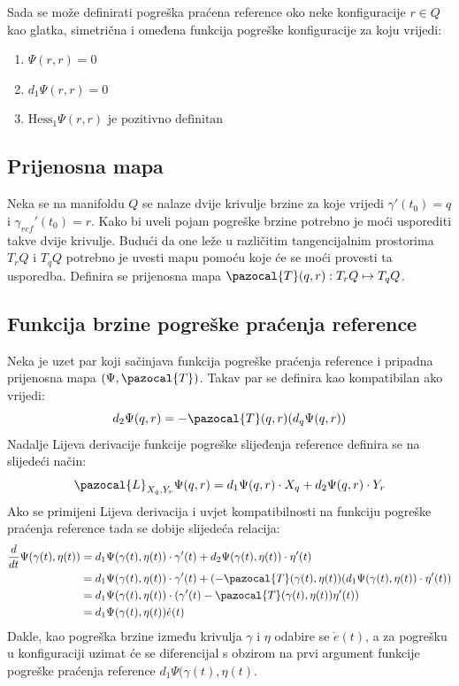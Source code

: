 \documentclass[times, utf8, diplomski]{fer}
\newcommand{\Ta}{\pazocal{T}}
\newcommand{\La}{\pazocal{L}}
\begin{document}
	\newpage
	\clearpage
	Sada se može definirati pogreška praćena reference oko neke konfiguracije $r\in Q$ kao glatka, simetrična i omeđena funkcija pogreške konfiguracije za koju vrijedi: 
	\begin{enumerate}
		\item $\Psi(r,r)=0$
		
		\item $d_1 \Psi(r, r) = 0$
		
		\item $\text{Hess}_1\Psi (r, r)\text{ je pozitivno definitan}$
	\end{enumerate}
	
	\subsection{Prijenosna mapa} Neka se na manifoldu $Q$ se nalaze dvije krivulje brzine za koje vrijedi $\gamma'(t_0)=q$ i $\gamma_{ref}'(t_0)=r$. Kako bi uveli pojam pogreške brzine potrebno je moći usporediti takve dvije krivulje. Budući da one leže u različitim tangencijalnim prostorima $T_r Q$ i $T_q Q$ potrebno je uvesti mapu pomoću koje će se moći provesti ta usporedba. Definira se prijenosna mapa $\Ta(q,r): T_r Q \mapsto T_q Q$.
	
	\subsection{Funkcija brzine pogreške praćenja reference} Neka je uzet par koji sačinjava funkcija pogreške praćenja reference i pripadna prijenosna mapa $(\Psi, \Ta)$. Takav par se definira kao kompatibilan ako vrijedi:
	\begin{equation}
		d_2\Psi(q,r) = - \Ta(q,r)(d_q\Psi(q,r))
	\end{equation}
	\noindent Nadalje Lijeva derivacije funkcije pogreške slijeđenja reference definira se na slijedeći način:
	\begin{equation}
		\La_{X_q, Y_r}\Psi(q,r) = d_1\Psi(q,r) \cdot X_q + d_2\Psi(q,r) \cdot Y_r
	\end{equation}
	\noindent Ako se primijeni Lijeva derivacija i uvjet kompatibilnosti na funkciju pogreške praćenja reference tada se dobije slijedeća relacija:
	\begin{align}
		\frac{d}{dt} \Psi(\gamma(t), \eta(t)) &= d_1\Psi(\gamma(t), \eta(t)) \cdot \gamma '(t) + d_2\Psi(\gamma(t), \eta(t)) \cdot \eta ' (t)\\
		&= d_1\Psi(\gamma(t), \eta(t)) \cdot \gamma '(t) + (- \Ta(\gamma(t), \eta(t))(d_1\Psi(\gamma(t), \eta(t)) \cdot \eta'(t)) \\
		&= d_1\Psi(\gamma(t), \eta(t)) \cdot (\gamma '(t) - \Ta(\gamma(t), \eta(t))\eta'(t)) \label{error}\\
		&= d_1\Psi(\gamma(t), \eta(t)) \dot{e}(t)
	\end{align}
	Dakle, kao pogreška brzine između krivulja $\gamma$ i $\eta$ odabire se $\dot{e}(t)$, a za pogrešku u konfiguraciji uzimat će se diferencijal s obzirom na prvi argument funkcije pogreške praćenja reference $d_1\Psi(\gamma(t), \eta(t)$.
	
\end{document}
